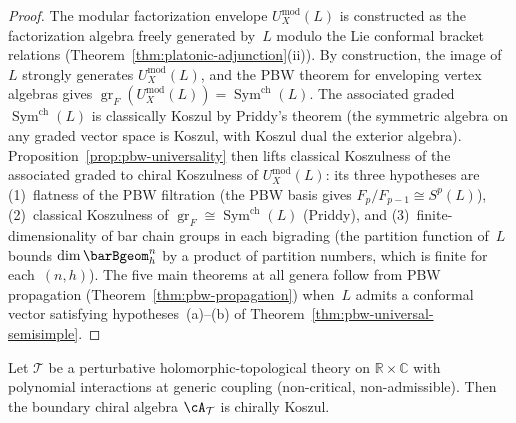 \begin{proof}
The modular factorization envelope
$U_X^{\mathrm{mod}}(L)$ is constructed as the
factorization algebra freely generated by~$L$
modulo the Lie conformal bracket relations
(Theorem~\ref{thm:platonic-adjunction}(ii)).
By construction, the image of~$L$ strongly generates
$U_X^{\mathrm{mod}}(L)$, and the PBW theorem for
enveloping vertex algebras gives
$\operatorname{gr}_F(U_X^{\mathrm{mod}}(L))
= \operatorname{Sym}^{\mathrm{ch}}(L)$.
The associated graded $\operatorname{Sym}^{\mathrm{ch}}(L)$
is classically Koszul by Priddy's theorem
(the symmetric algebra on any graded vector space is
Koszul, with Koszul dual the exterior algebra).
Proposition~\ref{prop:pbw-universality} then lifts
classical Koszulness of the associated graded to chiral
Koszulness of $U_X^{\mathrm{mod}}(L)$: its three
hypotheses are (1)~flatness of the PBW filtration
(the PBW basis gives
$F_p/F_{p-1} \cong S^p(L)$),
(2)~classical Koszulness of
$\operatorname{gr}_F \cong
\operatorname{Sym}^{\mathrm{ch}}(L)$
(Priddy), and
(3)~finite-dimensionality of bar chain groups in each
bigrading (the partition function of~$L$ bounds
$\dim \barBgeom^n_h$ by a product of partition
numbers, which is finite for each~$(n,h)$).
The five main theorems at all genera follow from
PBW propagation
(Theorem~\ref{thm:pbw-propagation}) when~$L$ admits
a conformal vector satisfying
hypotheses~(a)--(b) of
Theorem~\ref{thm:pbw-universal-semisimple}.
\end{proof}

\begin{corollary}\label{cor:generic-ht-koszul}
Let $\mathcal{T}$ be a perturbative
holomorphic-topological theory on
$\mathbb{R} \times \mathbb{C}$ with polynomial
interactions at generic coupling
\textup{(}non-critical, non-admissible\textup{)}.
Then the boundary chiral algebra
$\cA_\mathcal{T}$ is chirally Koszul.
\end{corollary}

